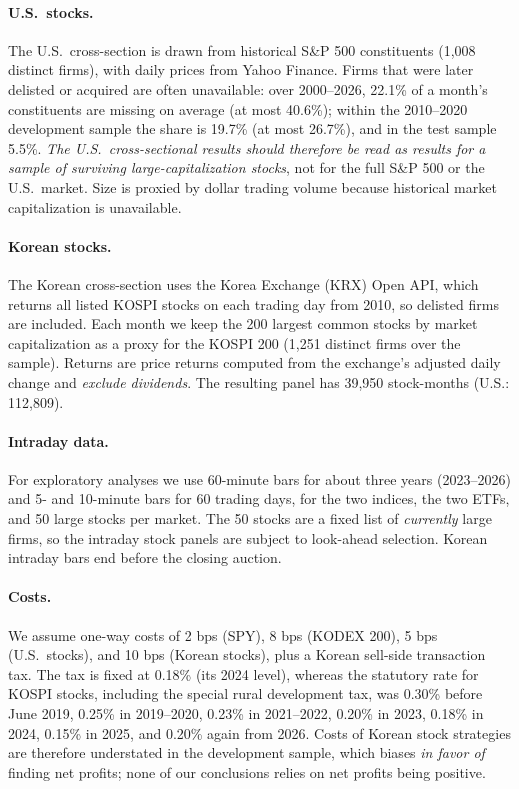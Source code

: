 \documentclass[11pt]{article}
\begin{document}
\paragraph{U.S.\ stocks.} The U.S.\ cross-section is drawn from historical S\&P 500 constituents (1,008 distinct firms), with daily prices from Yahoo Finance. Firms that were later delisted or acquired are often unavailable: over 2000--2026, 22.1\% of a month's constituents are missing on average (at most 40.6\%); within the 2010--2020 development sample the share is 19.7\% (at most 26.7\%), and in the test sample 5.5\%. \emph{The U.S.\ cross-sectional results should therefore be read as results for a sample of surviving large-capitalization stocks}, not for the full S\&P 500 or the U.S.\ market. Size is proxied by dollar trading volume because historical market capitalization is unavailable.

\paragraph{Korean stocks.} The Korean cross-section uses the Korea Exchange (KRX) Open API, which returns all listed KOSPI stocks on each trading day from 2010, so delisted firms are included. Each month we keep the 200 largest common stocks by market capitalization as a proxy for the KOSPI 200 (1,251 distinct firms over the sample). Returns are price returns computed from the exchange's adjusted daily change and \emph{exclude dividends}. The resulting panel has 39,950 stock-months (U.S.: 112,809).

\paragraph{Intraday data.} For exploratory analyses we use 60-minute bars for about three years (2023--2026) and 5- and 10-minute bars for 60 trading days, for the two indices, the two ETFs, and 50 large stocks per market. The 50 stocks are a fixed list of \emph{currently} large firms, so the intraday stock panels are subject to look-ahead selection. Korean intraday bars end before the closing auction.

\paragraph{Costs.} We assume one-way costs of 2 bps (SPY), 8 bps (KODEX 200), 5 bps (U.S.\ stocks), and 10 bps (Korean stocks), plus a Korean sell-side transaction tax. The tax is fixed at 0.18\% (its 2024 level), whereas the statutory rate for KOSPI stocks, including the special rural development tax, was 0.30\% before June 2019, 0.25\% in 2019--2020, 0.23\% in 2021--2022, 0.20\% in 2023, 0.18\% in 2024, 0.15\% in 2025, and 0.20\% again from 2026. Costs of Korean stock strategies are therefore understated in the development sample, which biases \emph{in favor of} finding net profits; none of our conclusions relies on net profits being positive.
\end{document}
